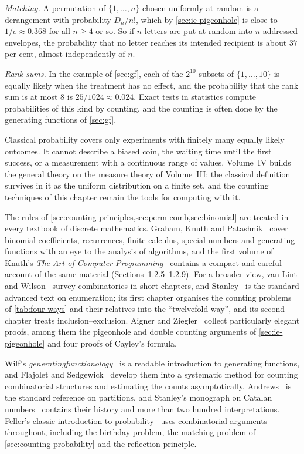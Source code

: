 \emph{Matching.} A permutation of $\{1,\ldots,n\}$ chosen uniformly at random is a derangement with probability $D_n/n!$, which by \cref{sec:ie-pigeonhole} is close to $1/e\approx0.368$ for all $n\ge4$ or so. So if $n$ letters are put at random into $n$ addressed envelopes, the probability that no letter reaches its intended recipient is about $37$ per cent, almost independently of $n$.

\emph{Rank sums.} In the example of \cref{sec:gf}, each of the $2^{10}$ subsets of $\{1,\ldots,10\}$ is equally likely when the treatment has no effect, and the probability that the rank sum is at most $8$ is $25/1024\approx0.024$. Exact tests in statistics compute probabilities of this kind by counting, and the counting is often done by the generating functions of \cref{sec:gf}.

Classical probability covers only experiments with finitely many equally likely outcomes. It cannot describe a biased coin, the waiting time until the first success, or a measurement with a continuous range of values. Volume~IV builds the general theory on the measure theory of Volume~III; the classical definition survives in it as the uniform distribution on a finite set, and the counting techniques of this chapter remain the tools for computing with it.

\chapternotes

The rules of \cref{sec:counting-principles,sec:perm-comb,sec:binomial} are treated in every textbook of discrete mathematics. Graham, Knuth and Patashnik~\cite{graham1994concrete} cover binomial coefficients, recurrences, finite calculus, special numbers and generating functions with an eye to the analysis of algorithms, and the first volume of Knuth's \emph{The Art of Computer Programming}~\cite{knuth1997taocp1} contains a compact and careful account of the same material (Sections~1.2.5--1.2.9). For a broader view, van Lint and Wilson~\cite{vanlint2001} survey combinatorics in short chapters, and Stanley~\cite{stanley2012ec1} is the standard advanced text on enumeration; its first chapter organises the counting problems of \cref{tab:four-ways} and their relatives into the ``twelvefold way'', and its second chapter treats inclusion--exclusion. Aigner and Ziegler~\cite{aigner2018proofs} collect particularly elegant proofs, among them the pigeonhole and double counting arguments of \cref{sec:ie-pigeonhole} and four proofs of Cayley's formula.

Wilf's \emph{generatingfunctionology}~\cite{wilf2006} is a readable introduction to generating functions, and Flajolet and Sedgewick~\cite{flajolet2009} develop them into a systematic method for counting combinatorial structures and estimating the counts asymptotically. Andrews~\cite{andrews1976partitions} is the standard reference on partitions, and Stanley's monograph on Catalan numbers~\cite{stanley2015catalan} contains their history and more than two hundred interpretations. Feller's classic introduction to probability~\cite{feller1968} uses combinatorial arguments throughout, including the birthday problem, the matching problem of \cref{sec:counting-probability} and the reflection principle.

